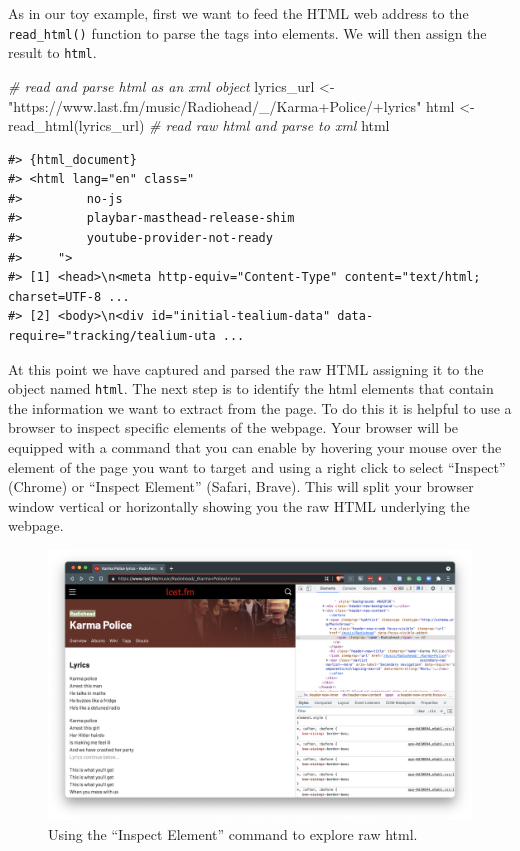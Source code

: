 \documentclass[
  letterpaper,
]{scrbook}
\newenvironment{Shaded}{\begin{snugshade}}{\end{snugshade}}
\newcommand{\CommentTok}[1]{\textcolor[rgb]{0.00,0.00,0.00}{\textit{#1}}}
\newcommand{\FunctionTok}[1]{\textcolor[rgb]{0.00,0.00,0.00}{#1}}
\newcommand{\NormalTok}[1]{\textcolor[rgb]{0.00,0.00,0.00}{#1}}
\newcommand{\OtherTok}[1]{\textcolor[rgb]{0.00,0.00,0.00}{#1}}
\newcommand{\StringTok}[1]{\textcolor[rgb]{0.00,0.00,0.00}{#1}}
\begin{document}
As in our toy example, first we want to feed the HTML web address to the
\texttt{read\_html()} function to parse the tags into elements. We will
then assign the result to \texttt{html}.

\begin{Shaded}
\begin{Highlighting}[]
\CommentTok{\# read and parse html as an xml object}
\NormalTok{lyrics\_url }\OtherTok{\textless{}{-}} \StringTok{"https://www.last.fm/music/Radiohead/\_/Karma+Police/+lyrics"}
\NormalTok{html }\OtherTok{\textless{}{-}} \FunctionTok{read\_html}\NormalTok{(lyrics\_url) }\CommentTok{\# read raw html and parse to xml}
\NormalTok{html}
\end{Highlighting}
\end{Shaded}

\begin{verbatim}
#> {html_document}
#> <html lang="en" class="
#>         no-js
#>         playbar-masthead-release-shim
#>         youtube-provider-not-ready
#>     ">
#> [1] <head>\n<meta http-equiv="Content-Type" content="text/html; charset=UTF-8 ...
#> [2] <body>\n<div id="initial-tealium-data" data-require="tracking/tealium-uta ...
\end{verbatim}

At this point we have captured and parsed the raw HTML assigning it to
the object named \texttt{html}. The next step is to identify the html
elements that contain the information we want to extract from the page.
To do this it is helpful to use a browser to inspect specific elements
of the webpage. Your browser will be equipped with a command that you
can enable by hovering your mouse over the element of the page you want
to target and using a right click to select ``Inspect'' (Chrome) or
``Inspect Element'' (Safari, Brave). This will split your browser window
vertical or horizontally showing you the raw HTML underlying the
webpage.

\begin{figure}[h]

{\centering \includegraphics[width=9.28in,height=\textheight]{./figures/acquire-data/ad-lastfm-artist-inspect.png}

}

\caption{\label{fig-ad-inspect-element-artist-lastfm}Using the ``Inspect
Element'' command to explore raw html.}

\end{figure}
\end{document}
